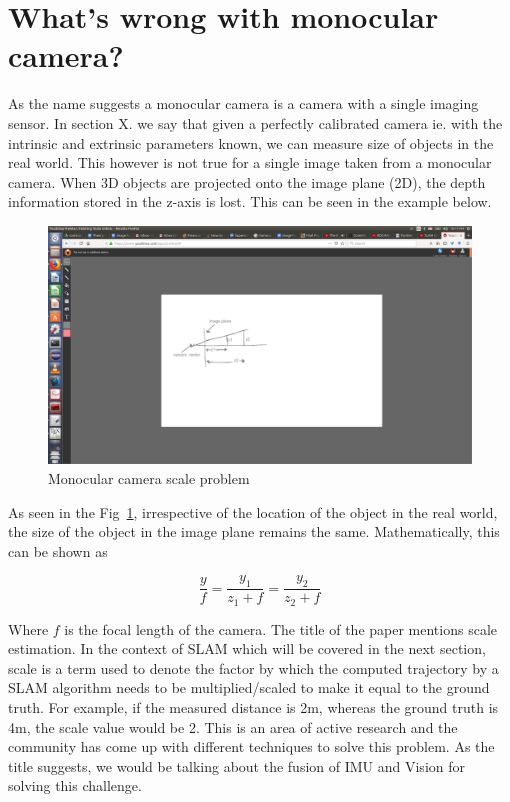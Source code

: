 \section{What's wrong with monocular camera?}
\label{mono_prob}

As the name suggests a monocular camera is a camera with a single imaging sensor. In section X. we say that given a perfectly calibrated camera ie. with the intrinsic and extrinsic parameters known, we can measure size of objects in the real world. This however is not true for a single image taken from a monocular camera. When 3D objects are projected onto the image plane (2D), the depth information stored in the z-axis is lost. This can be seen in the example below. 

\begin{figure}
  \includegraphics[width=\textwidth]{./figures/1.png}
\caption{Monocular camera scale problem}
\label{fig:mono1}       %
\end{figure}

As seen in the Fig~\ref{fig:mono1}, irrespective of the location of the object in the real world, the size of the object in the image plane remains the same. Mathematically, this can be shown as 

\begin{equation}
\frac{y}{f}=\frac{y_1}{z_1+f}=\frac{y_2}{z_2+f}
\end{equation}

Where $f$ is the focal length of the camera. The title of the paper mentions scale estimation. In the context of SLAM which will be covered in the next section, scale is a term used to denote the factor by which the computed trajectory by a SLAM algorithm needs to be multiplied/scaled to make it equal to the ground truth. For example, if the measured distance is 2m, whereas the ground truth is 4m, the scale value would be 2. This is an area of active research and the community has come up with different techniques to solve this problem. As the title suggests, we would be talking about the fusion of IMU and Vision for solving this challenge.
